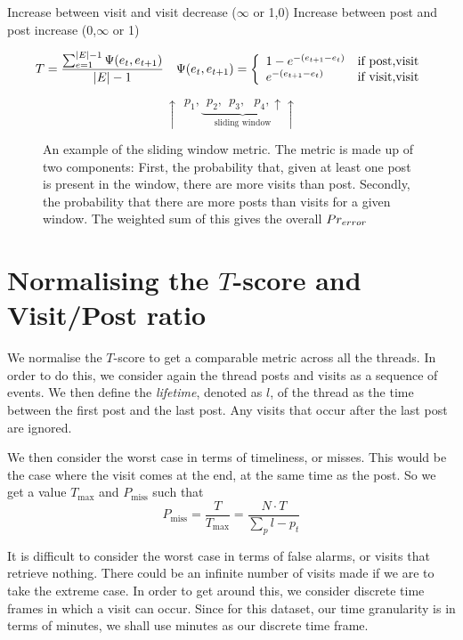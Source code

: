 Increase between visit and visit	decrease
($\infty$ or 1,0)
Increase between post and post		increase
(0,$\infty$ or 1)

\[
	\begin{array}{l l}
	T = \dfrac{%
		\sum_{e=1}^{|E|-1} \Psi(e_t,e_{t+1}) %
	}{|E|-1} &
		\Psi(e_t,e_{t+1}) = \left\{\begin{array}{l l}
				1-e^{-(e_{t+1} - e_t)}	& \text{if post,visit}\\
				e^{-(e_{t+1} - e_t)}			& \text{if visit,visit}\\
		\end{array}\right.
\end{array}
\]

\begin{figure}
\[
	\uparrow~~p_1,\underbrace{~~p_2,~~p_3,~~~p_4,\uparrow}_{\text{sliding window}}\uparrow
\]
\caption{An example of the sliding window metric. The metric is made up of two components: First, the probability that, given at least one post is present in the window, there are more visits than post. Secondly, the probability that there are more posts than visits for a given window. The weighted sum of this gives the overall $Pr_{error}$}\label{prerror}
\end{figure}


\section{Normalising the $T$-score and Visit/Post ratio}
We normalise the $T$-score to get a comparable metric across all the threads. In 
order to do this, we consider again the thread posts and visits as a sequence of 
events. We then define the \emph{lifetime}, denoted as $l$, of the thread as the 
time between the first post and the last post. Any visits that occur after the 
last post are ignored.

We then consider the worst case in terms of timeliness, or misses. This would be 
the case where the visit comes at the end, at the same time as the post. So we 
get a value $T_{\max}$ and $P_{\text{miss}}$ such that
\[
	P_{\text{miss}} = \frac{T}{T_{\max}} = \dfrac{N \cdot T}{\sum_p l - p_t}
\]

It is difficult to consider the worst case in terms of false alarms, or visits 
that retrieve nothing. There could be an infinite number of visits made if we 
are to take the extreme case. In order to get around this, we consider discrete 
time frames in which a visit can occur. Since for this dataset, our time 
granularity is in terms of minutes, we shall use minutes as our discrete time 
frame.

